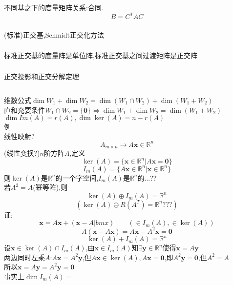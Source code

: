 \documentclass[11pt, a4paper, UTF8]{ctexart}
\begin{document}
\subsubsection{}
\subsubsection{}
不同基之下的度量矩阵关系:合同.
\[B=C^TAC\]
\subsubsection{}
(标准)正交基,Schmidt正交化方法
\subsubsection{}
标准正交基的度量阵是单位阵,标准正交基之间过渡矩阵是正交阵
\subsubsection{}
正交投影和正交分解定理
\subsection{}
\subsubsection{}
\subsubsection{}
\subsubsection{}
维数公式$\dim W_1+\dim W_2=\dim(W_1\cap W_2)+\dim(W_1+W_2)$\\
直和充要条件$W_1\cap W_2=\{\bm0\}\Leftrightarrow\dim W_1+\dim W_2=\dim(W_1+W_2)$\\
$\dim Im(A)=r(A),\dim\ker(A)=n-r(A)$\\
例\\
线性映射?
\[A_{m\times n}\to A\bm x\in\mathbb{R}^n\]
(线性变换?)$n$阶方阵$A$,定义\\
\[\ker(A)=\{\bm x\in\mathbb{R}^n|A\bm x=\bm0\}\]
\[I_m(A)=\{A\bm x\in\mathbb{R}^n|\bm x\in\mathbb{R}^n\}\]
则$\ker(A)$是$\mathbb{R}^n$的一个字空间,$I_m(A)$是$\mathbb{R}^n$的...??\\
若$A^2=A$(幂等阵),则
\[\ker(A)\oplus I_m(A)=\mathbb{R}^n\]
\[(\ker(A)\oplus R(A^T)=\mathbb{R}^n???)\]
证:\\
\[\bm x=A\bm x+(\bm x-A|bm x)\qquad(\in I_m(A),\in\ker(A))\]
\[A(\bm x-A\bm x)=A\bm x-A^2\bm x=\bm 0\]
\[\ker(A)+I_m(A)=\mathbb{R}^n\]
设$\bm x\in\ker(A)\cap I_m(A)$,由$\bm x\in I_m(A)$知$\exists\bm y\in\mathbb{R}^n$使得$\bm x=A\bm y$\\
两边同时左乘$A$:$A\bm x=A^2\bm y$,但$A\bm x\in\ker(A),A\bm x=\bm0$,即$A^2\bm y=\bm0$,但$A^2=A$\\
所以$\bm x=A\bm y=A^2\bm y=\bm0$\\
事实上$\dim I_m(A)=$
\end{document}
